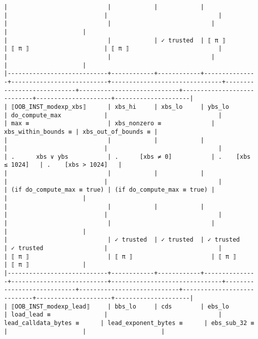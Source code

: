 \documentclass[varwidth=\maxdimen,margin=0.5cm,multi={verbatim}]{standalone}
\begin{document}
\begin{verbatim}
|                            |            |            |               |                           |                               |                            |                            |                            |                     |                     |
|                            |            | ✓ trusted  | ⟦ π ⟧         | ⟦ π ⟧                     | ⟦ π ⟧                         |                            |                            |                            |                     |                     |
|----------------------------+------------+------------+---------------+---------------------------+-------------------------------+----------------------------+----------------------------+----------------------------+---------------------+---------------------|
| ⟦OOB_INST_modexp_xbs⟧      | xbs_hi     | xbs_lo     | ybs_lo        | do_compute_max            |                               |                            | max ≡                      | xbs_nonzero ≡              | xbs_within_bounds ≡ | xbs_out_of_bounds ≡ |
|                            |            |            |               |                           |                               |                            | .      xbs ∨ ybs           | .      [xbs ≠ 0]           | .    [xbs ≤ 1024]   | .    [xbs > 1024]   |
|                            |            |            |               |                           |                               |                            | (if do_compute_max ≡ true) | (if do_compute_max ≡ true) |                     |                     |
|                            |            |            |               |                           |                               |                            |                            |                            |                     |                     |
|                            | ✓ trusted  | ✓ trusted  | ✓ trusted     | ✓ trusted                 |                               |                            | ⟦ π ⟧                      | ⟦ π ⟧                      | ⟦ π ⟧               | ⟦ π ⟧               |
|----------------------------+------------+------------+---------------+---------------------------+-------------------------------+----------------------------+----------------------------+----------------------------+---------------------+---------------------|
| ⟦OOB_INST_modexp_lead⟧     | bbs_lo     | cds        | ebs_lo        | load_lead ≡               |                               | lead_calldata_bytes ≡      | lead_exponent_bytes ≡      | ebs_sub_32 ≡               |                     |                     |

\end{verbatim}
\end{document}
